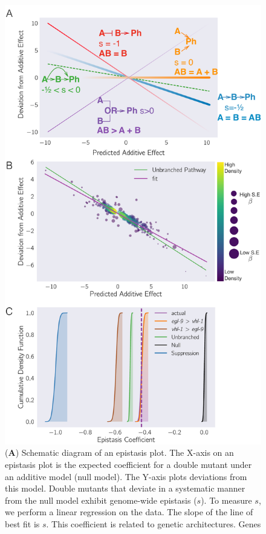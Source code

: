 \documentclass[9pt,twocolumn,twoside]{pnas-new}
\begin{document}
\begin{figure}[tbhp]
\centering
\includegraphics[width=\linewidth]{figs/egl9hif1-epistasis.pdf}
\caption{
(\textbf{A}) Schematic diagram of an epistasis plot. The X-axis on an epistasis
plot is the expected coefficient for a double mutant under an additive model (null model).
The Y-axis plots deviations from this model. Double mutants that deviate in a
systematic manner from the null model exhibit genome-wide epistasis ($s$). To
measure $s$, we perform a linear regression on the data. The slope of the line
of best fit is $s$. This coefficient is related to genetic architectures. Genes
}
\end{figure}
\end{document}
